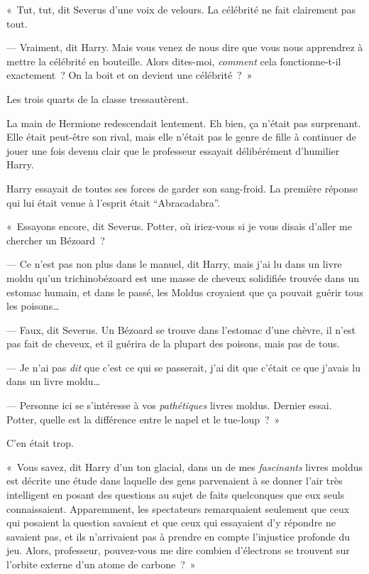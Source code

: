«~Tut, tut, dit Severus d'une voix de velours.
La célébrité ne fait clairement pas tout.

--- Vraiment, dit Harry.
Mais vous venez de nous dire que vous nous apprendrez à mettre la célébrité en bouteille.
Alors dites-moi, \emph{comment} cela fonctionne-t-il exactement~?
On la boit et on devient une célébrité~?~»

Les trois quarts de la classe tressautèrent.

La main de Hermione redescendait lentement.
Eh bien, ça n'était pas surprenant.
Elle était peut-être son rival, mais elle n'était pas le genre de fille à continuer de jouer une fois devenu clair que le professeur essayait délibérément d'humilier Harry.

Harry essayait de toutes ses forces de garder son sang-froid.
La première réponse qui lui était venue à l'esprit était “Abracadabra”.

«~Essayons encore, dit Severus.
Potter, où iriez-vous si je vous disais d'aller me chercher un Bézoard~?

--- Ce n'est pas non plus dans le manuel, dit Harry, mais j'ai lu dans un livre moldu qu'un trichinobézoard est une masse de cheveux solidifiée trouvée dans un estomac humain, et dans le passé, les Moldus croyaient que ça pouvait guérir tous les poisons…

--- Faux, dit Severus.
Un Bézoard se trouve dans l'estomac d'une chèvre, il n'est pas fait de cheveux, et il guérira de la plupart des poisons, mais pas de tous.

--- Je n'ai pas \emph{dit} que c'est ce qui se passerait, j'ai dit que c'était ce que j'avais lu dans un livre moldu…

--- Personne ici se s'intéresse à vos \emph{pathétiques} livres moldus.
Dernier essai.
Potter, quelle est la différence entre le napel et le tue-loup~?~»

C'en était trop.

«~Vous savez, dit Harry d'un ton glacial, dans un de mes \emph{fascinants} livres moldus est décrite une étude dans laquelle des gens parvenaient à se donner l'air très intelligent en posant des questions au sujet de faits quelconques que eux seuls connaissaient.
Apparemment, les spectateurs remarquaient seulement que ceux qui posaient la question savaient et que ceux qui essayaient d'y répondre ne savaient pas, et ils n'arrivaient pas à prendre en compte l'injustice profonde du jeu.
Alors, professeur, pouvez-vous me dire combien d'électrons se trouvent sur l'orbite externe d'un atome de carbone~?~»


